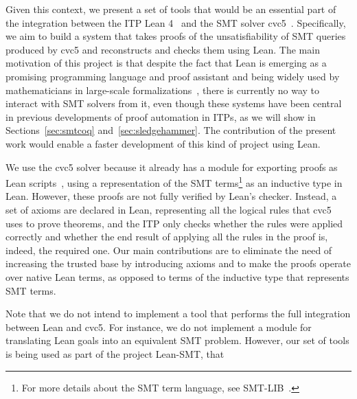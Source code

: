 Given this context, we present a set of tools that would be an essential
part of the integration between the ITP Lean 4~\cite{lean} and the SMT solver cvc5~\cite{cvc5}.
%
Specifically, we aim to build a system that takes proofs of the unsatisfiability of
SMT queries produced by cvc5 and reconstructs and checks them using Lean.
%
The main motivation of this project is that despite the fact that Lean is
emerging as a promising programming language and proof assistant and being
widely used by mathematicians in large-scale
formalizations~\cite{mathlib, scholze}, there is currently no way to
interact with SMT solvers from it, even though these systems have been
central in previous developments of proof automation in ITPs, as we will show in Sections~\ref{sec:smtcoq}
and~\ref{sec:sledgehammer}. The contribution of the present work
would enable a faster development of this kind of project using Lean.

We use the cvc5 solver because it already has a module for exporting proofs as
Lean scripts~\cite{Barbosa2022}, using a representation of the SMT terms\footnote{For more details
about the SMT term language, see SMT-LIB~\cite{smtlib}.} as an inductive type in Lean.
However, these proofs are not fully verified by Lean's checker. Instead, a set of
axioms are declared in Lean, representing all the logical rules that cvc5 uses to prove
theorems, and the ITP only checks whether the rules were applied correctly and whether
the end result of applying all the rules in the proof is, indeed, the required one.
Our main contributions are to eliminate the need of increasing the trusted base by introducing
axioms and to make the proofs operate over native Lean terms, as opposed to terms
of the inductive type that represents SMT terms.

Note that we do not intend to implement a tool that performs the full integration
between Lean and cvc5. For instance, we do not implement a module for translating
Lean goals into an equivalent SMT problem. However, our set of tools is being used
as part of the project Lean-SMT, that
